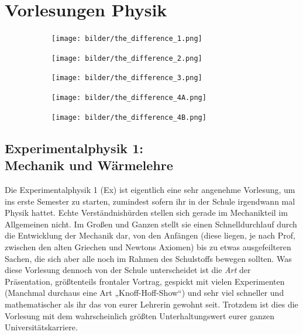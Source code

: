 \section*{Vorlesungen Physik}

\begin{figure}[t]
    \centering
    \begin{subfigure}[b]{.18\textwidth}
    \texttt{[image: bilder/the\_difference\_1.png]}	    
    \end{subfigure}
    \begin{subfigure}[b]{.18\textwidth}
    \texttt{[image: bilder/the\_difference\_2.png]}
    \end{subfigure}
    \begin{subfigure}[b]{.18\textwidth}
    \texttt{[image: bilder/the\_difference\_3.png]}
    \end{subfigure}
    \begin{subfigure}[b]{.18\textwidth}
    \texttt{[image: bilder/the\_difference\_4A.png]}
    \end{subfigure}
    \begin{subfigure}[b]{.18\textwidth}
    \texttt{[image: bilder/the\_difference\_4B.png]}
    \end{subfigure}
\end{figure}

\subsection{Experimentalphysik 1: \\Mechanik und Wärmelehre}
\label{ex1}
Die Experimentalphysik 1 (\gls{Ex}) ist eigentlich eine sehr angenehme Vorlesung, um ins erste Semester zu starten, zumindest sofern ihr in der Schule irgendwann mal Physik hattet. Echte Verständnishürden stellen sich gerade im Mechanikteil im Allgemeinen nicht. Im Großen und Ganzen stellt sie einen Schnelldurchlauf durch die Entwicklung der Mechanik dar, von den Anfängen (diese liegen, je nach Prof, zwischen den alten Griechen und Newtons Axiomen) bis zu etwas ausgefeilteren Sachen, die sich aber alle noch im Rahmen des Schulstoffs bewegen sollten. Was diese Vorlesung dennoch von der Schule unterscheidet ist die \emph{Art} der Präsentation, größtenteils frontaler Vortrag, gespickt mit vielen Experimenten (Manchmal durchaus eine Art „Knoff-Hoff-Show“) und sehr viel schneller und mathematischer als ihr das von eurer Lehrerin gewohnt seit. Trotzdem ist dies die Vorlesung mit dem wahrscheinlich größten Unterhaltungswert eurer ganzen Universitätskarriere.



